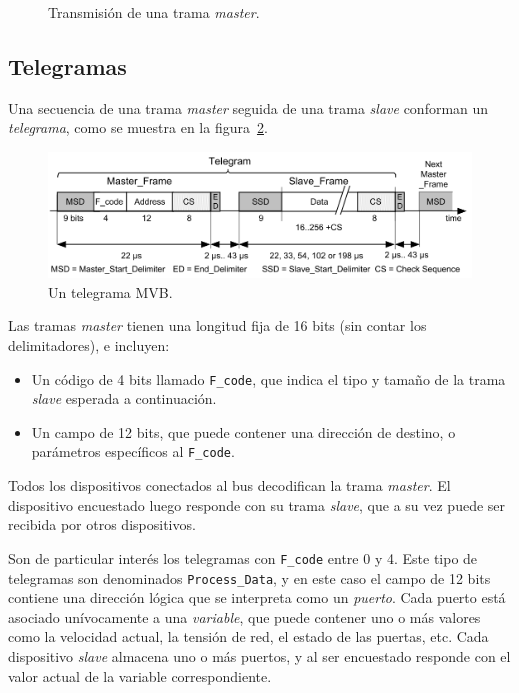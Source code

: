 \begin{figure}[htbp]
	\centering
    {
        \fontsize{9pt}{9pt}\selectfont
        
    }
	\caption[Transmisión de una trama master]{Transmisión de una trama \textit{master}.}
    \label{fig:manchester}
\end{figure}


\subsection{Telegramas}

Una secuencia de una trama \textit{master} seguida de una trama \textit{slave} conforman un \textit{telegrama}, como se muestra en la figura~\ref{fig:telegrama}.

\begin{figure}[htbp]
	\centering
	\includegraphics[width=1\textwidth]{./Figures/telegrama.png}
	\caption[Un telegrama MVB]{Un telegrama MVB.
        \\ }
    \label{fig:telegrama}
\end{figure}

Las tramas \textit{master} tienen una longitud fija de 16 bits (sin contar los delimitadores), e incluyen:

\begin{itemize}
\item Un código de 4 bits llamado \texttt{F\_code}, que indica el tipo y tamaño de la trama \textit{slave} esperada a continuación.
\item Un campo de 12 bits, que puede contener una dirección de destino, o parámetros específicos al \texttt{F\_code}.
\end{itemize}

Todos los dispositivos conectados al bus decodifican la trama \textit{master}. El dispositivo encuestado luego responde con su trama \textit{slave}, que a su vez puede ser recibida por otros dispositivos.

Son de particular interés los telegramas con \texttt{F\_code} entre 0 y 4. Este tipo de telegramas son denominados \texttt{Process\_Data}, y en este caso el campo de 12 bits contiene una dirección lógica que se interpreta como un \textit{puerto}. Cada puerto está asociado unívocamente a una \textit{variable}, que puede contener uno o más valores como la velocidad actual, la tensión de red, el estado de las puertas, etc. Cada dispositivo \textit{slave} almacena uno o más puertos, y al ser encuestado responde con el valor actual de la variable correspondiente.

